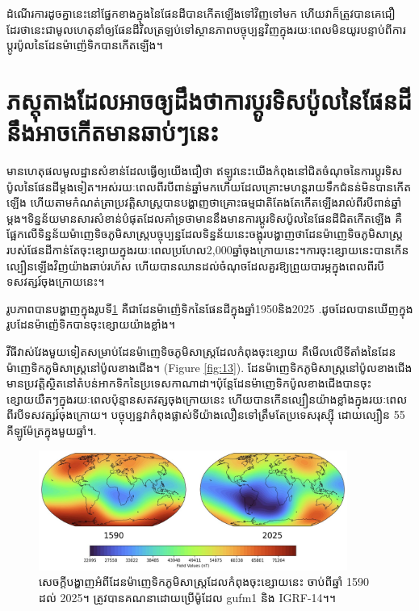 \documentclass[10pt,twocolumn,letterpaper]{article}
\begin{document}
ដំណើរការដូចគ្នានេះនៅផ្នែកខាងក្នុងនៃផែនដីបានកើតឡើងទៅវិញទៅមក ហើយវាក៏ត្រូវបានគេជឿដែរថានេះជាមូលហេតុនាំឲ្យផែនដីវិលត្រឡប់ទៅស្ថានភាពបច្ចុប្បន្នវិញក្នុងរយៈពេលមិនយូរបន្ទាប់ពីការប្តូរប៉ូលនៃដែនម៉ាញ៉េទិកបានកើតឡើង។

\section{ភស្ដុតាងដែលអាចឲ្យដឹងថាការប្ដូរទិសប៉ូលនៃផែនដីនឹងអាចកើតមានឆាប់ៗនេះ}

មានហេតុផលមូលដ្ឋានសំខាន់ដែលធ្វើឲ្យយើងជឿថា ឥឡូវនេះយើងកំពុងនៅជិតចំណុចនៃការប្ដូរទិសប៉ូលនៃផែនដីម្តងទៀត។​អស់រយៈពេលពីរបីពាន់ឆ្នាំមកហើយដែលគ្រោះមហន្តរាយទឹកជំនន់មិនបានកើតឡើង ហើយតាមកំណត់ត្រាប្រវត្តិសាស្ត្របានបង្ហាញថាគ្រោះធម្មជាតិតែងតែកើតឡើងរាល់ពីរបីពាន់ឆ្នាំម្តង។ទិន្នន័យមានសារសំខាន់បំផុតដែលគាំទ្រថាមាននឹងមានការប្ដូរទិសប៉ូលនៃផែនដីជិតកើតឡើង គឺផ្អែកលើទិន្នន័យម៉ាញេទិចភូមិសាស្ត្របច្ចុប្បន្ន​ដែលទិន្នន័យនេះចង្អុរបង្ហាញថា​ដែនម៉ាញេទិចភូមិសាស្ត្ររបស់ផែនដីកាន់តែចុះខ្សោយក្នុងរយៈពេលប្រហែល2,000ឆ្នាំចុងក្រោយនេះ។ការចុះខ្សោយនេះបានកើនល្បឿនឡើងវិញយ៉ាងឆាប់រហ័ស ហើយបានឈានដល់ចំណុចដែលគួរឱ្យព្រួយបារម្ភក្នុងពេលពីរបីទសវត្សរ៍ចុងក្រោយនេះ។


រូបភាពបានបង្ហាញក្នុងរូបទី\ref{fig:14} គឺជាដែនម៉ាញ៉េទិកនៃផែនដីក្នុងឆ្នាំ​1950​និង​2025 \cite{125,126}.ដូចដែលបានឃើញក្នុងរូបដែនម៉ាញ៉េទិកបានចុះខ្សោយយ៉ាងខ្លាំង។ 

វីធីវាស់វែងមួយទៀតសម្រាប់ដែនម៉ាញេទិចភូមិសាស្ត្រដែលកំពុងចុះខ្សោយ គឺមើលលើទីតាំងនៃដែនម៉ាញេទិកភូមិសាស្ត្រនៅប៉ូលខាងជើង។ (Figure \ref{fig:13}). ដែនម៉ាញេទិកភូមិសាស្ត្រនៅប៉ូលខាងជើងមានប្រវត្តិស្ថិតនៅតំបន់អាកទិកនៃប្រទេសកាណាដា។ប៉ុន្តែដែនម៉ាញេទិកប៉ូលខាងជើងបានចុះខ្សោយយឺតៗក្នុងរយៈពេលប៉ុន្មានសតវត្សចុងក្រោយនេះ ហើយបានកើនល្បឿនយ៉ាងខ្លាំងក្នុងរយៈពេលពីរបីទសវត្សរ៍ចុងក្រោយ។ បច្ចុប្បន្នវាកំពុងផ្លាស់ទីយ៉ាងលឿនទៅត្រឹមតែប្រទេសរុស្ស៊ី ដោយល្បឿន 55 គីឡូម៉ែត្រក្នុងមួយឆ្នាំ។\cite{124}.

\begin{figure}[t]
\begin{center}
\includegraphics[width=0.9\textwidth]{saa.jpg}
\end{center}
   \caption{សេចក្ដីបង្ហាញអំពីដែនម៉ាញេទិកភូមិសាស្ត្រដែលកំពុងចុះខ្សោយនេះ ចាប់ពីឆ្នាំ 1590 ដល់ 2025។ ត្រូវបានគណនាដោយប្រើម៉ូដែល gufm1 និង IGRF-14។\cite{125,126}។}
\label{fig:14}
\end{figure}
\end{document}
